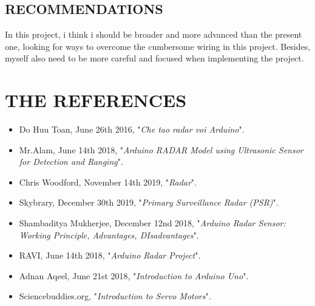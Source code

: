 \documentclass[13pt,a4paper]{report}
\begin{document}
        \section{RECOMMENDATIONS}
            In this project, i think i should be broader and more advanced than the present one, 
            looking for ways to overcome the cumbersome wiring in this project. Besides, myself also 
            need to be more careful and focused when implementing the project.

    \chapter{THE REFERENCES}
        \begin{itemize}
            \item Do Huu Toan, June 26th 2016, "\textit{Che tao radar voi Arduino}".
            \item Mr.Alam, June 14th 2018, "\textit{Arduino RADAR Model using Ultrasonic Sensor for Detection and Ranging}".
            \item Chris Woodford, November 14th 2019, "\textit{Radar}".
            \item Skybrary, December 30th 2019, "\textit{Primary Surveillance Radar (PSR)}".
            \item Shambaditya Mukherjee, December 12nd 2018, "\textit{Arduino Radar Sensor: Working Principle, Advantages, DIsadvantages}".
            \item RAVI, June 14th 2018, "\textit{Arduino Radar Project}".
            \item Adnan Aqeel, June 21st 2018, "\textit{Introduction to Arduino Uno}".
            \item Sciencebuddies.org, "\textit{Introduction to Servo Motors}".
        \end{itemize}
\end{document}
